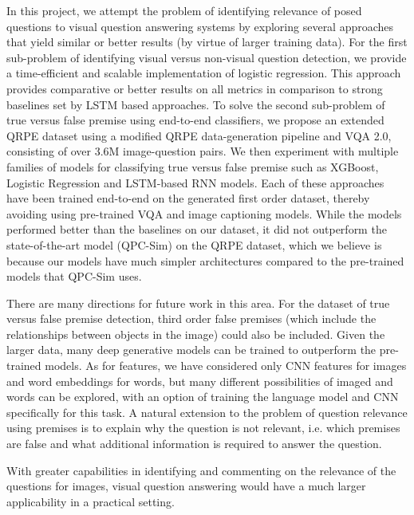 In this project, we attempt the problem of identifying relevance of posed questions to visual question answering systems by exploring several approaches that yield similar or better results (by virtue of larger training data). For the first sub-problem of identifying visual versus non-visual question detection, we provide a time-efficient and scalable implementation of logistic regression. This approach provides comparative or better results on all metrics in comparison to strong baselines set by LSTM based approaches. To solve the second sub-problem of true versus false premise using end-to-end classifiers, we propose an extended QRPE dataset using a modified QRPE data-generation pipeline and VQA 2.0, consisting of over 3.6M image-question pairs. We then experiment with multiple families of models for classifying true versus false premise such as XGBoost, Logistic Regression and LSTM-based RNN models. Each of these approaches have been trained end-to-end on the generated first order dataset, thereby avoiding using pre-trained VQA and image captioning models. While the models performed better than the baselines on our dataset, it did not outperform the state-of-the-art model (QPC-Sim) on the QRPE dataset, which we believe is because our models have much simpler architectures compared to the pre-trained models that QPC-Sim uses.

There are many directions for future work in this area. For the dataset of true versus false premise detection, third order false premises (which include the relationships between objects in the image) could also be included. Given the larger data, many deep generative models can be trained to outperform the pre-trained models. As for features, we have considered only CNN features for images and word embeddings for words, but many different possibilities of imaged and words can be explored, with an option of training the language model and CNN specifically for this task. A natural extension to the problem of question relevance using premises is to explain why the question is not relevant, i.e. which premises are false and what additional information is required to answer the question.

With greater capabilities in identifying and commenting on the relevance of the questions for images, visual question answering would have a much larger applicability in a practical setting.

